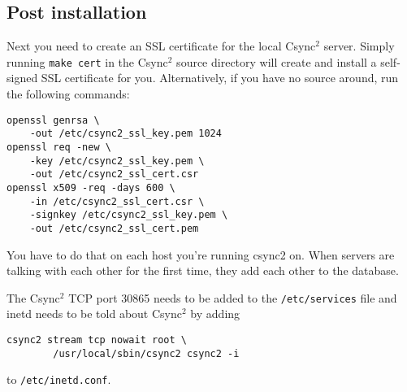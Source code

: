 \documentclass[a4paper,twocolumn]{article}
\def\csync2{{\sc Csync$^{2}$}}
\begin{document}
\subsection{Post installation}

Next you need to create an SSL certificate for the local \csync2 server.
Simply running {\tt make cert} in the \csync2 source directory will create and
install a self-signed SSL certificate for you.  Alternatively, if you have no
source around, run the following commands:

\begin{verbatim}
openssl genrsa \
    -out /etc/csync2_ssl_key.pem 1024
openssl req -new \
    -key /etc/csync2_ssl_key.pem \
    -out /etc/csync2_ssl_cert.csr
openssl x509 -req -days 600 \
    -in /etc/csync2_ssl_cert.csr \
    -signkey /etc/csync2_ssl_key.pem \
    -out /etc/csync2_ssl_cert.pem
\end{verbatim}

You have to do that on each host you're running csync2 on. When servers are
talking with each other for the first time, they add each other to the database.

The \csync2 TCP port 30865 needs to be added to the {\tt /etc/services} file and
inetd needs to be told about \csync2 by adding

\begin{verbatim}
csync2 stream tcp nowait root \
        /usr/local/sbin/csync2 csync2 -i
\end{verbatim}

to {\tt /etc/inetd.conf}.

\end{document}
